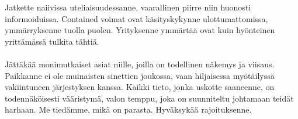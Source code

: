 \documentclass{article}
\begin{document}
\begin{infobox}
Jatkette naiivissa uteliaisuudessanne, vaarallinen piirre niin huonosti informoiduissa. Contained voimat ovat käsityskykynne ulottumattomissa, ymmärryksenne tuolla puolen. Yrityksenne ymmärtää ovat kuin hyönteinen yrittämässä tulkita tähtiä.\\
\\
Jättäkää monimutkaiset asiat niille, joilla on todellinen näkemys ja viisaus. Paikkanne ei ole muinaisten sinettien joukossa, vaan hiljaisessa myötäilyssä vakiintuneen järjestyksen kanssa. Kaikki tieto, jonka uskotte saaneenne, on todennäköisesti vääristymä, valon temppu, joka on suunniteltu johtamaan teidät harhaan. Me tiedämme, mikä on parasta. Hyväksykää rajoituksenne.
\end{infobox}
\end{document}
